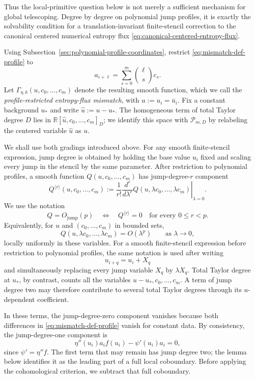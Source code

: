 \documentclass[11pt]{amsart}
\theoremstyle{plain}
\theoremstyle{definition}
\theoremstyle{remark}
\numberwithin{equation}{section}
\theoremstyle{plain}
\begin{document}
Thus the local-primitive question below is not merely a sufficient mechanism
for global telescoping.  Degree by degree on polynomial jump profiles, it is
exactly the solvability condition for a translation-invariant finite-stencil
correction to the canonical centered numerical entropy flux
\eqref{eq:canonical-centered-entropy-flux}.


Using Subsection~\ref{sec:polynomial-profile-coordinates}, restrict
\eqref{eq:mismatch-def-profile} to
\[
a_{i+\ell}
=\sum_{s=0}^{m}\binom{\ell}{s}c_s.
\]
Let $\Gamma_{\eta,k}(u,c_0,\ldots,c_m)$ denote the resulting smooth
function, which we call the \emph{profile-restricted entropy-flux mismatch},
with $u:=u_i=\bar u_i$.  Fix a constant background $u_*$ and write
$\widehat u:=u-u_*$.  The homogeneous term of total Taylor
degree $D$ lies in
$\mathbb R[\widehat u,c_0,\ldots,c_m]_D$; we identify this space with
$\mathscr P_{m,D}$ by relabeling the centered variable $\widehat u$ as $u$.

We shall use both gradings introduced above.  For any smooth finite-stencil
expression, jump degree is obtained by holding the base value $u_i$ fixed
and scaling every jump in the stencil by the same parameter.  After
restriction to polynomial profiles, a smooth function
$Q(u,c_0,\ldots,c_m)$ has jump-degree-$r$ component
\begin{equation}\label{eq:jump-degree-component}
	Q^{\langle r\rangle}(u,c_0,\ldots,c_m)
	:=\frac1{r!}
	\left.\frac{d^r}{d\lambda^r}
	Q(u,\lambda c_0,\ldots,\lambda c_m)
	\right|_{\lambda=0}.
\end{equation}
We use the notation
\begin{equation}\label{eq:jump-order-notation}
	Q=O_{\mathrm{jump}}(p)
	\quad\Longleftrightarrow\quad
	Q^{\langle r\rangle}=0
	\quad\text{for every }0\le r<p.
\end{equation}
Equivalently, for $u$ and $(c_0,\ldots,c_m)$ in bounded sets,
\[
Q(u,\lambda c_0,\ldots,\lambda c_m)
=O(\lambda^p)
\qquad\text{as }\lambda\to0,
\]
locally uniformly in these variables.  For a smooth finite-stencil
expression before restriction to polynomial profiles, the same notation is
used after writing
\[
u_{i+q}=u_i+X_q
\]
and simultaneously replacing every jump variable $X_q$ by $\lambda X_q$. 
Total Taylor degree at $u_*$,
by contrast, counts all the variables $u-u_*,c_0,\ldots,c_m$.  A term of
jump degree two may therefore contribute to several total Taylor degrees
through its $u$-dependent coefficient.

In these terms, the jump-degree-zero component vanishes because both
differences in \eqref{eq:mismatch-def-profile} vanish for constant data.  By
consistency, the jump-degree-one component is
\[
\eta''(u_i)a_i f(u_i)-\psi'(u_i)a_i=0,
\]
since $\psi'=\eta''f$.  The first term that may remain has jump degree two;
the lemma below identifies it as the leading part of a full local
coboundary.  Before applying the cohomological criterion, we subtract that
full coboundary.
\end{document}
